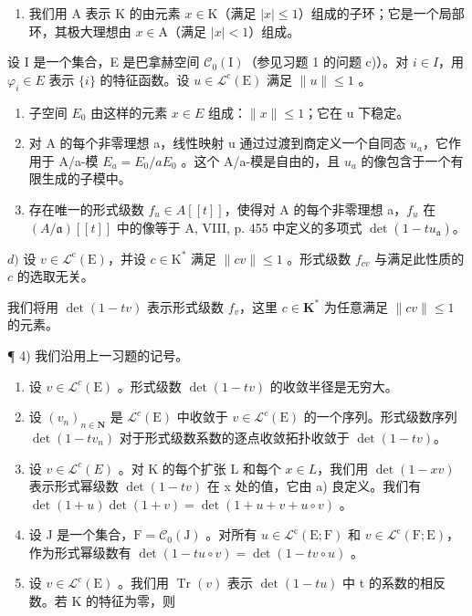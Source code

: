 \begin{enumerate}
\def\labelenumi{\arabic{enumi})}
\setcounter{enumi}{2}
\tightlist
\item
  我们用 A 表示 K 的由元素 \(x \in \mathrm{K}\)（满足 \(|x| \leqslant 1\)）组成的子环；它是一个局部环，其极大理想由 \(x \in \mathrm{A}\)（满足 \(|x| < 1\)）组成。
\end{enumerate}

设 I 是一个集合，E 是巴拿赫空间 \(\mathcal{C}_{0}(\mathrm{I})\)（参见习题 1 的问题 c)）。对 \(i \in I\)，用 \(\varphi_{i} \in E\) 表示 \(\{i\}\) 的特征函数。设 \(u \in \mathcal{L}^{\mathrm{c}}(\mathrm{E})\) 满足 \(\|u\| \leqslant 1\) 。

\begin{enumerate}
\def\labelenumi{\alph{enumi})}
\item
  子空间 \(E_{0}\) 由这样的元素 \(x \in E\) 组成：\(\|x\| \leqslant 1\)；它在 u 下稳定。
\item
  对 A 的每个非零理想 a，线性映射 u 通过过渡到商定义一个自同态 \(u_{a}\)，它作用于 A/a-模 \(E_{a} = E_{0}/aE_{0}\) 。这个 A/a-模是自由的，且 \(u_{a}\) 的像包含于一个有限生成的子模中。
\item
  存在唯一的形式级数 \(f_{u} \in A[[t]]\)，使得对 A 的每个非零理想 a，\(f_{u}\) 在 \((A/\mathfrak{a})[[t]]\) 中的像等于 A, VIII, p. 455 中定义的多项式 \(\det(1 - tu_{\mathfrak{a}})\)。
\end{enumerate}

\(d)\) 设 \(v \in \mathcal{L}^{\mathrm{c}}(\mathrm{E})\)，并设 \(c \in \mathrm{K}^{*}\) 满足 \(\|cv\| \leqslant 1\) 。形式级数 \(f_{cv}\) 与满足此性质的 \(c\) 的选取无关。

我们将用 \(\det(1-tv)\) 表示形式级数 \(f_v\)，这里 \(c \in \mathbf{K}^*\) 为任意满足 \(\|cv\| \leqslant 1\) 的元素。

¶ 4) 我们沿用上一习题的记号。

\begin{enumerate}
\def\labelenumi{\alph{enumi})}
\item
  设 \(v \in \mathcal{L}^c(\mathrm{E})\) 。形式级数 \(\det(1 - tv)\) 的收敛半径是无穷大。
\item
  设 \((v_{n})_{n\in\mathbf{N}}\) 是 \(\mathcal{L}^{c}(\mathrm{E})\) 中收敛于 \(v\in\mathcal{L}^{c}(\mathrm{E})\) 的一个序列。形式级数序列 \(\det(1-tv_{n})\) 对于形式级数系数的逐点收敛拓扑收敛于 \(\det(1-tv)\)。
\item
  设 \(v \in \mathcal{L}^{c}(E)\) 。对 K 的每个扩张 L 和每个 \(x \in L\)，我们用 \(\det(1 - xv)\) 表示形式幂级数 \(\det(1 - tv)\) 在 x 处的值，它由 a) 良定义。我们有 \(\det(1 + u)\det(1 + v) = \det(1 + u + v + u \circ v)\) 。
\item
  设 J 是一个集合，\(\mathrm{F} = \mathcal{C}_{0}(\mathrm{J})\) 。对所有 \(u \in \mathcal{L}^{\mathrm{c}}(\mathrm{E};\mathrm{F})\) 和 \(v \in \mathcal{L}^{\mathrm{c}}(\mathrm{F};\mathrm{E})\)，作为形式幂级数有 \(\det(1 - tu \circ v) = \det(1 - tv \circ u)\) 。
\item
  设 \(v \in \mathcal{L}^{\mathrm{c}}(\mathrm{E})\) 。我们用 \(\operatorname{Tr}(v)\) 表示 \(\det(1 - tu)\) 中 t 的系数的相反数。若 K 的特征为零，则
\end{enumerate}

